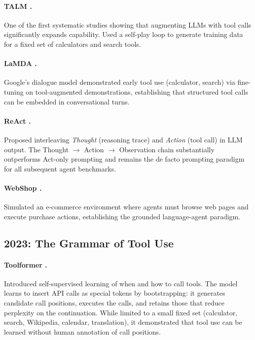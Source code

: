 \documentclass[11pt]{article}
\begin{document}
\paragraph{TALM \citep{parisi2022talm}.}
One of the first systematic studies showing that augmenting LLMs with tool calls significantly
expands capability. Used a self-play loop to generate training data for a fixed set of calculators
and search tools.

\paragraph{LaMDA \citep{thoppilan2022lamda}.}
Google's dialogue model demonstrated early tool use (calculator, search) via fine-tuning on
tool-augmented demonstrations, establishing that structured tool calls can be embedded in
conversational turns.

\paragraph{ReAct \citep{yao2023react}.}
Proposed interleaving \emph{Thought} (reasoning trace) and \emph{Action} (tool call) in LLM output.
The Thought $\rightarrow$ Action $\rightarrow$ Observation chain substantially outperforms
Act-only prompting and remains the de facto prompting paradigm for all subsequent agent benchmarks.

\paragraph{WebShop \citep{yao2022webshop}.}
Simulated an e-commerce environment where agents must browse web pages and execute purchase actions,
establishing the grounded language-agent paradigm.

\subsection{2023: The Grammar of Tool Use}

\paragraph{Toolformer \citep{schick2023toolformer}.}
Introduced self-supervised learning of when and how to call tools. The model learns to insert API
calls as special tokens by bootstrapping: it generates candidate call positions, executes the calls,
and retains those that reduce perplexity on the continuation. While limited to a small fixed set
(calculator, search, Wikipedia, calendar, translation), it demonstrated that tool use can be learned
without human annotation of call positions.
\end{document}
